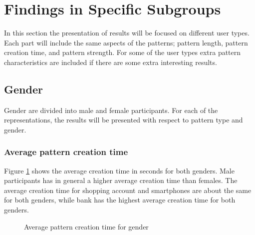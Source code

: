 \section{Findings in Specific Subgroups}

  In this section the presentation of results will be focused on different user types. Each part will include the same aspects of the patterns; pattern length, pattern creation time, and pattern strength. For some of the user types extra pattern characteristics are included if there are some extra interesting results. 

	\subsection{Gender}

    Gender are divided into male and female participants. For each of the representations, the results will be presented with respect to pattern type and gender. 

    \subsubsection{Average pattern creation time}

    Figure \ref{fig:avgcreationtimegender} shows the average creation time in seconds for both genders. Male participants has in general a higher average creation time than females. The average creation time for shopping account and smartphones are about the same for both genders, while bank has the highest average creation time for both genders. 

    \begin{figure}[H]
      \centering
      \caption{Average pattern creation time for gender}
      \label{fig:avgcreationtimegender}
    \end{figure}

